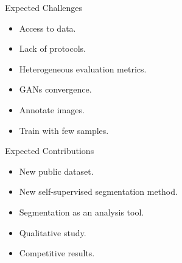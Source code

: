 
\begin{frame}{Expected Challenges}
    \begin{itemize}
        \item Access to data.
        \item Lack of protocols.
        \item Heterogeneous evaluation metrics.
        \item GANs convergence.
        \item Annotate images.
        \item Train with few samples.
    \end{itemize}
\end{frame}

\begin{frame}{Expected Contributions}
    \begin{itemize}
        \item New public dataset.
        \item New self-supervised segmentation method.
        \item Segmentation as an analysis tool.
        \item Qualitative study.
        \item Competitive results.
    \end{itemize}
\end{frame}

